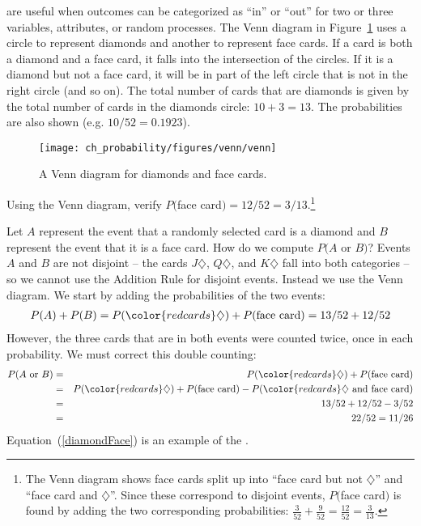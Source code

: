  are useful when outcomes can be categorized as ``in'' or ``out'' for two or three variables, attributes, or random processes. The Venn diagram in Figure~\ref{venn} uses a circle to represent diamonds and another to represent face cards. If a card is both a diamond and a face card, it falls into the intersection of the circles. If it is a diamond but not a face card, it will be in part of the left circle that is not in the right circle (and so on). The total number of cards that are diamonds is given by the total number of cards in the diamonds circle: $10+3=13$. The probabilities are also shown (e.g. $10/52 = 0.1923$).

\begin{figure}
\centering
\texttt{[image: ch\_probability/figures/venn/venn]}
\caption{A Venn diagram for diamonds and face cards.}
\label{venn}
\end{figure}

\begin{exercise}
Using the Venn diagram, verify $P($face card$) = 12/52=3/13$.\footnote{The Venn diagram shows face cards split up into ``face card but not {\color{redcards}$\diamondsuit$}'' and ``face card and {\color{redcards}$\diamondsuit$}''. Since these correspond to disjoint events, $P($face card$)$ is found by adding the two corresponding probabilities: $\frac{3}{52} + \frac{9}{52} = \frac{12}{52} = \frac{3}{13}$.}
\end{exercise}

Let $A$ represent the event that a randomly selected card is a diamond and $B$ represent the event that it is a face card. How do we compute $P(A$ or $B)$? Events $A$ and $B$ are not disjoint -- the cards {\color{redcards}$J\diamondsuit$}, {\color{redcards}$Q\diamondsuit$}, and {\color{redcards}$K\diamondsuit$} fall into both categories -- so we cannot use the Addition Rule for disjoint events. Instead we use the Venn diagram. We start by adding the probabilities of the two events:
\begin{eqnarray*}
P(A) + P(B) = P({\color{redcards}\diamondsuit}) + P(\text{face card}) = 13/52 + 12/52
\label{overCountFaceDiamond}
\end{eqnarray*}
However, the three cards that are in both events were counted twice, once in each probability. We must correct this double counting:
\begin{eqnarray}
P(A\text{ or } B) &=&P({\color{redcards}\diamondsuit}) + P(\text{face card})  \notag \\
 &=& P({\color{redcards}\diamondsuit}) + P(\text{face card}) - P({\color{redcards}\diamondsuit}  \text{ and face card}) \label{diamondFace} \\
 &=& 13/52 + 12/52 - 3/52 \notag \\
 &=& 22/52 = 11/26 \notag
\end{eqnarray}
Equation~(\ref{diamondFace}) is an example of the .

